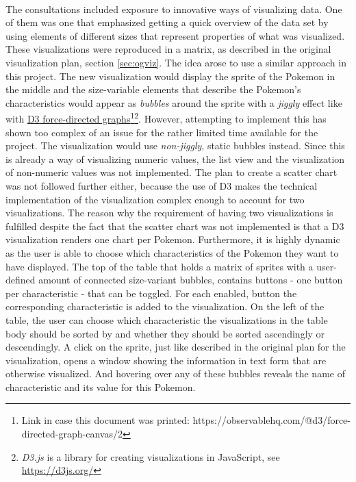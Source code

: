\documentclass[12pt, a4paper]{article}
\begin{document}
			\paragraph{}
				The consultations included exposure to innovative ways of visualizing data. One of them was one that emphasized getting a quick overview of the data set by using elements of different sizes that represent properties of what was visualized. These visualizations were reproduced in a matrix, as described in the original visualization plan, section \ref{sec:ogviz}. The idea arose to use a similar approach in this project. The new visualization would display the sprite of the Pokemon in the middle and the size-variable elements that describe the Pokemon's characteristics would appear as \textit{bubbles} around the sprite with a \textit{jiggly} effect like with \href{https://observablehq.com/@d3/force-directed-graph-canvas/2}{D3 force-directed graphs}\footnote{Link in case this document was printed: https://observablehq.com/@d3/force-directed-graph-canvas/2}\footnote{\textit{D3.js} is a library for creating visualizations in JavaScript, see \href{https://d3js.org/}{https://d3js.org/}}. However, attempting to implement this has shown too complex of an issue for the rather limited time available for the project. The visualization would use \textit{non-jiggly}, static bubbles instead. Since this is already a way of visualizing numeric values, the list view and the visualization of non-numeric values was not implemented. The plan to create a scatter chart was not followed further either, because the use of D3 makes the technical implementation of the visualization complex enough to account for two visualizations. The reason why the requirement of having two visualizations is fulfilled despite the fact that the scatter chart was not implemented is that a D3 visualization renders one chart per Pokemon. Furthermore, it is highly dynamic as the user is able to choose which characteristics of the Pokemon they want to have displayed. The top of the table that holds a matrix of sprites with a user-defined amount of connected size-variant bubbles, contains buttons - one button per characteristic - that can be toggled. For each enabled, button the corresponding characteristic is added to the visualization. On the left of the table, the user can choose which characteristic the visualizations in the table body should be sorted by and whether they should be sorted ascendingly or descendingly. A click on the sprite, just like described in the original plan for the visualization, opens a window showing the information in text form that are otherwise visualized. And hovering over any of these bubbles reveals the name of characteristic and its value for this Pokemon.
\end{document}
